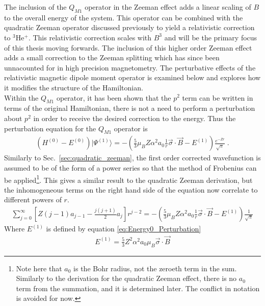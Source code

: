             The inclusion of the $Q_{M1}$ operator in the Zeeman effect adds a linear scaling of $B$ to the overall energy of the system. This operator can be combined with the quadratic Zeeman operator discussed previously to yield a relativistic correction to $^3$He$^+$. This relativistic correction scales with $B^3$ and will be the primary focus of this thesis moving forwards. The inclusion of this higher order Zeeman effect adds a small correction to the Zeeman splitting which has since been unnacounted for in high precision magnetometry. The perturbative effects of the relativistic magnetic dipole moment operator is examined below and explores how it modifies the structure of the Hamiltonian. \\
            
            Within the $Q_{M1}$ operator, it has been shown that the $p^2$ term can be written in terms of the original Hamiltonian, there is not a need to perform a perturbation about $p^2$ in order to receive the desired correction to the energy. Thus the perturbation equation for the $Q_{M1}$ operator is
            \begin{align}
                \left(H^{(0)} - E^{(0)}\right) \vert \varPsi^{(1)}\rangle = -\left(\frac{5}{3}\mu_B Z \alpha^2 a_0 \frac{1}{r} \vec{\sigma} \cdot \vec{B} - E^{(1)} \right) \frac{e^{-Zr}}{\sqrt{\pi}}\;.
            \end{align}
            \noindent Similarly to Sec.~\ref{sec:quadratic_zeeman}, the first order corrected wavefunction is assumed to be of the form of a power series so that the method of Frobenius can be applied\footnote{Note here that $a_0$ is the Bohr radius, not the zeroeth term in the sum. Similarly to the derivation for the quadratic Zeeman effect, there is no $a_0$ term from the summation, and it is determined later. The conflict in notation is avoided for now.}. This gives a similar result to the quadratic Zeeman derivation, but the inhomogeneous terms on the right hand side of the equation now correlate to different powers of $r$.
            \begin{align}
                \sum_{j = 0}^\infty \left[ Z(j-1)a_{j-1} - \frac{j(j+1)}{2} a_j \right] r^{j -2} = -\left(\frac{5}{3}\mu_B Z \alpha^2 a_0 \frac{1}{r} \vec{\sigma} \cdot \vec{B} - E^{(1)} \right) \frac{1}{\sqrt{\pi}}
            \end{align}
            \noindent Where $E^{(1)}$ is defined by equation \eqref{eq:Energy0_Perturbation}
            \begin{align}
                E^{(1)} = \frac{5}{3} Z^2 \alpha^2 a_0 \mu_B \vec{\sigma} \cdot \vec{B}
            \end{align}
